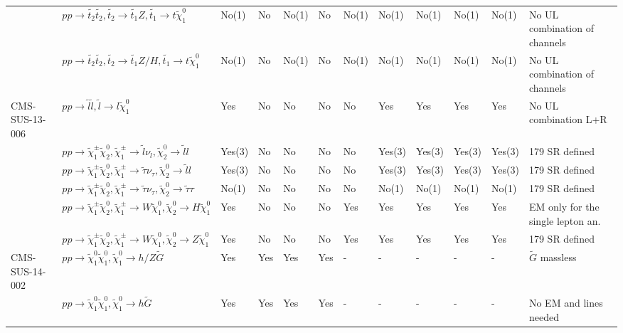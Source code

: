 \documentclass[11pt,A4paper]{article}
\begin{document}
\begin{landscape}
\begin{longtable} {|l|l|l|l|l|l|l|l|l|l|l|l|}
 & $pp \rightarrow \tilde{t_2} \tilde{t_2}, \tilde{t_2}\rightarrow \tilde{t_1} Z , \tilde{t_1} \rightarrow t \tilde{\chi}_1 ^0$ & No(1) & No & No(1) & No & No(1) & No(1) & No(1) & No(1) & No(1) & No UL combination of channels\\
  & $pp \rightarrow \tilde{t_2} \tilde{t_2}, \tilde{t_2}\rightarrow \tilde{t_1} Z/H , \tilde{t_1} \rightarrow t \tilde{\chi}_1 ^0$ & No(1) & No & No(1) & No & No(1) & No(1) & No(1) & No(1) & No(1) & No UL combination of channels\\ \hline
CMS-SUS-13-006 & $pp \rightarrow \tilde{l} \tilde{l}, \tilde{l} \rightarrow l \tilde{\chi}_1 ^0$ & Yes & No & No & No & No & Yes & Yes & Yes & Yes & No UL combination L+R\\
 & $pp \rightarrow \tilde{\chi}_1 ^{\pm} \tilde{\chi}_2 ^0 , \tilde{\chi}_1 ^{\pm} \rightarrow \tilde{l} \nu_{l}, \tilde{\chi}_2 ^0 \rightarrow \tilde{l} l $ & Yes(3) & No & No & No & No & Yes(3) & Yes(3) & Yes(3) & Yes(3) & 179 SR defined\\
 & $pp \rightarrow \tilde{\chi}_1 ^{\pm} \tilde{\chi}_2 ^0 , \tilde{\chi}_1 ^{\pm} \rightarrow \tilde{\tau} \nu_{\tau}, \tilde{\chi}_2 ^0 \rightarrow \tilde{l} l $ & Yes(3) & No & No & No & No & Yes(3) & Yes(3) & Yes(3) & Yes(3) & 179 SR defined\\
 & $pp \rightarrow \tilde{\chi}_1 ^{\pm} \tilde{\chi}_2 ^0 , \tilde{\chi}_1 ^{\pm} \rightarrow \tilde{\tau} \nu_{\tau}, \tilde{\chi}_2 ^0 \rightarrow \tilde{\tau} \tau$ & No(1) & No & No & No & No & No(1) & No(1) & No(1) & No(1) & 179 SR defined\\
 & $pp \rightarrow \tilde{\chi}_1 ^{\pm} \tilde{\chi}_2 ^0 , \tilde{\chi}_1 ^{\pm} \rightarrow W \tilde{\chi}_1 ^0 , \tilde{\chi}_2 ^0 \rightarrow H \tilde{\chi}_1 ^0$ & Yes & No & No & No & Yes & Yes & Yes & Yes & Yes & EM only for the single lepton an.\\
  & $pp \rightarrow \tilde{\chi}_1 ^{\pm} \tilde{\chi}_2 ^0 , \tilde{\chi}_1 ^{\pm} \rightarrow W \tilde{\chi}_1 ^0 , \tilde{\chi}_2 ^0 \rightarrow Z \tilde{\chi}_1 ^0$ & Yes & No & No & No & Yes & Yes & Yes & Yes & Yes & 179 SR defined\\ \hline
CMS-SUS-14-002 & $pp \rightarrow \tilde{\chi}_1 ^0 \tilde{\chi}_1 ^0 , \tilde{\chi}_1 ^0 \rightarrow h / Z \tilde{G}$ & Yes & Yes & Yes & Yes & - & - & - & - & - & $\tilde{G}$ massless\\
 & $pp \rightarrow \tilde{\chi}_1 ^0 \tilde{\chi}_1 ^0 , \tilde{\chi}_1 ^0 \rightarrow h \tilde{G}$ & Yes & Yes & Yes & Yes & - & - & - & - & - & No EM and lines needed\\

\end{longtable}
\end{landscape}
\end{document}
